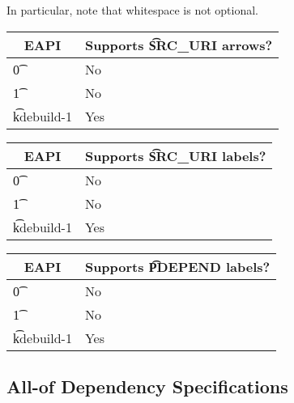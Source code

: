 In particular, note that whitespace is not optional.

\IFKDEBUILDELSE
{
    \begin{table}
    \centering
     \label{uri-arrows-table}
    \begin{tabular}{ l l }
        \toprule
        \multicolumn{1}{c}{\textbf{EAPI}} &
        \multicolumn{1}{c}{\textbf{Supports \t{SRC\_URI} arrows?}} \\
        \midrule
    \t{0} & No \\
    \t{1} & No \\
    \t{kdebuild-1} & Yes \\
    \bottomrule
    \end{tabular}
    \end{table}

    \begin{table}
    \centering
     \label{uri-labels-table}
    \begin{tabular}{ l l }
        \toprule
        \multicolumn{1}{c}{\textbf{EAPI}} &
        \multicolumn{1}{c}{\textbf{Supports \t{SRC\_URI} labels?}} \\
        \midrule
    \t{0} & No \\
    \t{1} & No \\
    \t{kdebuild-1} & Yes \\
    \bottomrule
    \end{tabular}
    \end{table}

    \begin{table}
    \centering
     \label{pdepend-labels-table}
    \begin{tabular}{ l l }
        \toprule
        \multicolumn{1}{c}{\textbf{EAPI}} &
        \multicolumn{1}{c}{\textbf{Supports \t{PDEPEND} labels?}} \\
        \midrule
    \t{0} & No \\
    \t{1} & No \\
    \t{kdebuild-1} & Yes \\
    \bottomrule
    \end{tabular}
    \end{table}
}{
}

\subsection{All-of Dependency Specifications}

